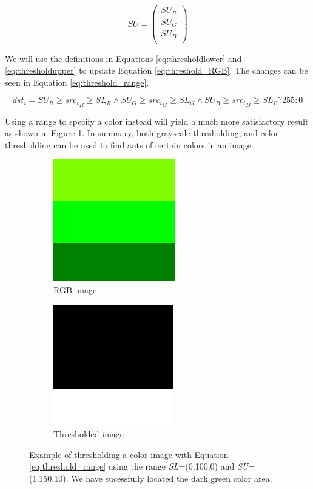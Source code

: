 \begin{equation}
SU =  
\begin{pmatrix}
  SU_{R}\\
  SU_{G}\\
  SU_{B}\\
\end{pmatrix}
\label{eq:thresholdupper}
\end{equation}

We will use the definitions in Equations \ref{eq:thresholdlower} and \ref{eq:thresholdupper} to update Equation \ref{eq:threshold_RGB}. The changes can be seen in Equation \ref{eq:threshold_range}.

\begin{equation}
{dst_i} = SU_R \geq {src_i}_R \geq SL_R \wedge SU_G \geq {src_i}_G \geq SL_G \wedge SU_B \geq {src_i}_B \geq SL_B? 255: 0
\label{eq:threshold_range}
\end{equation}

Using a range to specify a color instead will yield a much more satisfactory result as shown in Figure \ref{fig:green_final}. In summary, both grayscale thresholding, and color thresholding can be used to find ants of certain colors in an image.\\

\begin{figure}
        \centering
        \begin{subfigure}[b]{0.3\textwidth}
                \includegraphics[scale=0.5]{img/green}
                \caption{RGB image}
        \end{subfigure}
		\quad
        \begin{subfigure}[b]{0.3\textwidth}
                \includegraphics[scale=0.5]{img/finalthresh}
                \caption{Thresholded image}
        \end{subfigure}
		\caption{Example of thresholding a color image with Equation \ref{eq:threshold_range} using the range \textit{SL}=(0,100,0) and \textit{SU}=(1,150,10). We have sucessfully located the dark green color area.}
		\label{fig:green_final}
\end{figure}

